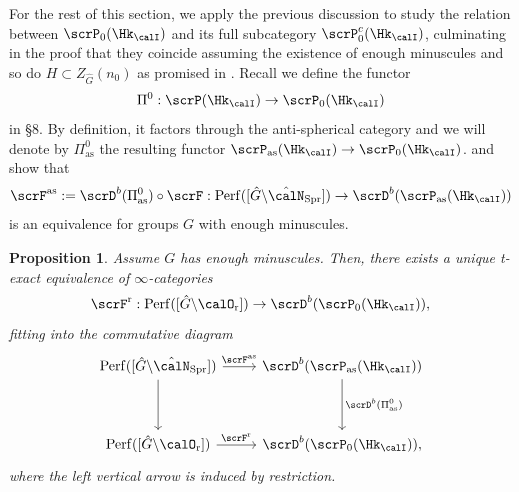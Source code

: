 \documentclass[10pt, reqno]{amsart}
\theoremstyle{plain}
\newtheorem{proposition}[theorem]{Proposition}
\theoremstyle{definition}
\numberwithin{equation}{section}
\begin{document}
For the rest of this section, we apply the previous discussion to study the relation between $\scrP_0(\Hk_{\calI})$ and its full subcategory $\scrP^c_0(\Hk_{\calI})$, culminating in the proof that they coincide assuming the existence of enough minuscules and so do $H \subset Z_{\hat{G}}(n_0)$ as promised in .		
Recall we define the functor
\begin{equation}
	\Pi^0:\scrP(\Hk_{\calI})\rightarrow \scrP_0(\Hk_{\calI})
\end{equation}
in \S8. By definition, it factors through the anti-spherical category 
and we will denote by 
$\Pi^0_\mathrm{as}$ the resulting functor $\scrP_\mathrm{as}(\Hk_{\calI})\rightarrow \scrP_0(\Hk_{\calI})$.  and  show that 
\begin{equation}
	\scrF^\mathrm{as}:=\scrD^b(\Pi^0_\mathrm{as})\circ \scrF:\mathrm{Perf}([\hat{G}\backslash \hat{\calN}_{\mathrm{Spr}}])\rightarrow \scrD^b(\scrP_\mathrm{as}(\Hk_{\calI}))
\end{equation}
is an equivalence for groups $G$ with enough minuscules.
\begin{proposition}\label{prop_equivalence_F^r}
	Assume $G$ has enough minuscules. Then, there exists a unique t-exact equivalence of $\infty$-categories
	\begin{equation}
		\scrF^\mathrm{r}:\mathrm{Perf}([\hat{G}\backslash \calO_\mathrm{r}])\rightarrow \scrD^b(\scrP_0(\Hk_{\calI})),
	\end{equation}
	fitting into the commutative diagram
	\begin{equation}
		\begin{tikzcd}[row sep=huge]
			\mathrm{Perf}([\hat{G}\backslash \hat{\calN}_{\mathrm{Spr}}])\arrow[r,"\scrF^\mathrm{as}"] \arrow[d] & \scrD^b(\scrP_\mathrm{as}(\Hk_{\calI}))\arrow[d,"\scrD^b(\Pi^0_\mathrm{as})"]\\
			\mathrm{Perf}([\hat{G}\backslash \calO_\mathrm{r}])\arrow[r,"\scrF^\mathrm{r}"] & \scrD^b(\scrP_0(\Hk_{\calI})),
		\end{tikzcd}
	\end{equation}
	where the left vertical arrow is induced by restriction.
\end{proposition}
\end{document}
